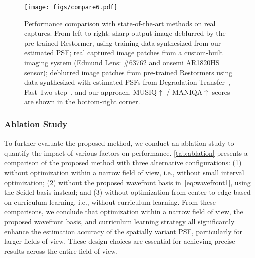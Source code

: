    

\begin{figure*}[t]
\vspace{-0.0cm} 
\centering
    \texttt{[image: figs/compare6.pdf]}
    \setlength{\abovecaptionskip}{-0.3cm} 
    \caption{Performance comparison with state-of-the-art methods on real captures. From left to right: sharp output image deblurred by the pre-trained Restormer, using training data synthesized from our estimated PSF; real captured image patches from a custom-built imaging system (Edmund Lens: \#63762 and onsemi AR1820HS sensor); deblurred image patches from pre-trained Restormers using data synthesized with estimated PSFs from Degradation Transfer~\cite{chen2021extreme}, Fast Two-step~\cite{eboli2022fast}, and our approach. MUSIQ$\uparrow$ / MANIQA$\uparrow$ scores are shown in the bottom-right corner.}
    \vspace{-0.4cm} 
    \label{fig:comparision}
\end{figure*}




\subsubsection{Ablation Study}


To further evaluate the proposed method, we conduct an ablation study to quantify the impact of various factors on performance. \cref{tab:ablation} presents a comparison of the proposed method with three alternative configurations: (1) without optimization within a narrow field of view, i.e., without small interval optimization; (2) without the proposed wavefront basis in~\cref{eq:wavefront1}, using the Seidel basis instead; and (3) without optimization from center to edge based on curriculum learning, i.e., without curriculum learning. From these comparisons, we conclude that optimization within a narrow field of view, the proposed wavefront basis, and curriculum learning strategy all significantly enhance the estimation accuracy of the spatially variant PSF, particularly for larger fields of view. These design choices are essential for achieving precise results across the entire field of view.


